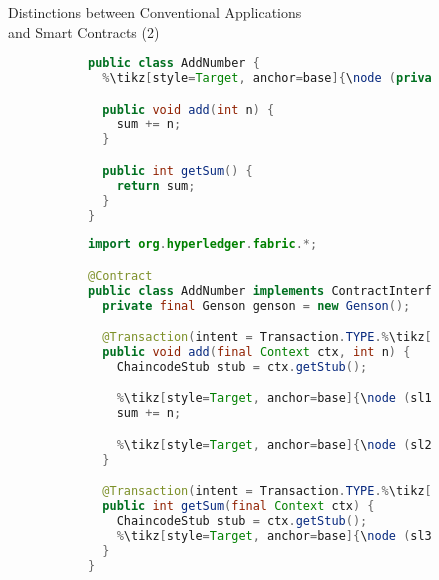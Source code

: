 \documentclass[xcolor=svgnames]{beamer}
\begin{document}
\begin{frame}[fragile]{Distinctions between Conventional Applications\\ and Smart Contracts (2)}

\begin{figure}
\centering
\begin{subfigure}[T]{0.4\textwidth}
\begin{lstlisting}[language=java,basicstyle=\tiny, escapechar=\%,]
public class AddNumber {
  %\tikz[style=Target, anchor=base]{\node (private) {\color{blue}{\bfseries private}}}% int sum = 0;

  public void add(int n) {
    sum += n;
  }

  public int getSum() {
    return sum;
  }
}
\end{lstlisting}
\end{subfigure}
\hfill
\begin{subfigure}[T]{0.55\textwidth}
\begin{lstlisting}[language=java,basicstyle=\tiny, escapechar=\%,]
import org.hyperledger.fabric.*;

@Contract
public class AddNumber implements ContractInterface {
  private final Genson genson = new Genson();

  @Transaction(intent = Transaction.TYPE.%\tikz[style=Target, anchor=base]{\node (submit) {SUBMIT}}%)
  public void add(final Context ctx, int n) {
    ChaincodeStub stub = ctx.getStub();

    %\tikz[style=Target, anchor=base]{\node (sl1) {}}%int sum = Integer.parseInt(stub.getStringState("sum"));
    sum += n;

    %\tikz[style=Target, anchor=base]{\node (sl2) {}}%stub.putStringState("sum", String.valueOf(sum));
  }

  @Transaction(intent = Transaction.TYPE.%\tikz[style=Target, anchor=base]{\node (evaluate) {EVALUATE}}%)
  public int getSum(final Context ctx) {
    ChaincodeStub stub = ctx.getStub();
    %\tikz[style=Target, anchor=base]{\node (sl3) {}}%return Integer.parseInt(stub.getStringState("sum"));
  }
}
\end{lstlisting}
\end{subfigure}
\end{figure}


\end{frame}
\end{document}
